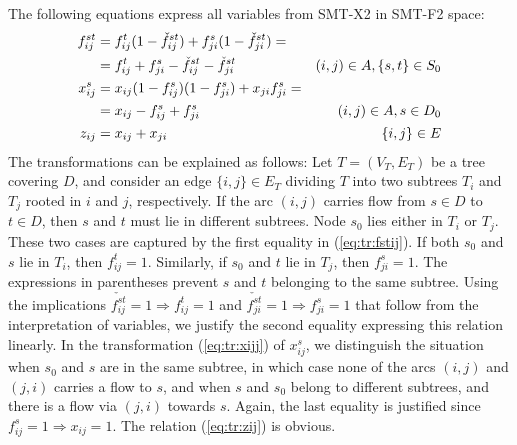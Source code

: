 The following equations express all variables from SMT-X2 in SMT-F2 space:
\begin{subequations}
\begin{align}
\notag\label{eq:tr:fstij}f^{st}_{ij}&=f^t_{ij}(1-\check{f}^{st}_{ij})+f^{s}_{ji}(1-\check{f}^{st}_{ji})= \\
&=  f^t_{ij}+f^s_{ji} - \check{f}^{st}_{ij} - \check{f}^{st}_{ji}& (i,j)\in A, \{s,t\}\in S_0\\
\notag\label{eq:tr:xijj}x^s_{ij}&=x_{ij}(1-f^{s}_{ij})(1-f^{s}_{ji})+x_{ji}f^{s}_{ji}=
\\&= x_{ij}-f^s_{ij} + f^{s}_{ji} & (i,j)\in A, s\in D_0\\
\label{eq:tr:zij}z_{ij}&=x_{ij}+x_{ji}& \{i,j\}\in E
\end{align}
\end{subequations}
The transformations can be explained as follows:
Let $T=(V_T,E_T)$ be a tree covering $D$, and consider an edge $\{i,j\}\in E_T$ dividing $T$ into two subtrees $T_i$ and $T_j$ rooted in $i$ and $j$, respectively.  If the arc $(i,j)$ carries flow from $s\in D$ to $t\in D$, then $s$ and $t$ must lie in different subtrees. Node $s_0$ lies either in $T_i$ or $T_j$.
These two cases are captured by the first equality in (\ref{eq:tr:fstij}). If both $s_0$ and $s$ lie in $T_i$, then $f_{ij}^t=1$. Similarly, if $s_0$ and $t$ lie in $T_j$, then $f_{ji}^s=1$. The expressions in parentheses prevent $s$ and $t$ belonging to the same subtree. Using the implications $\check{f^{st}_{ij}}=1\Rightarrow f_{ij}^t=1$ and $\check{f^{st}_{ji}}=1\Rightarrow f_{ji}^s=1$ that follow from the interpretation of variables, we justify the second equality expressing this relation linearly.
In the transformation (\ref{eq:tr:xijj}) of $x_{ij}^s$, we distinguish the situation when $s_0$ and $s$ are in the same subtree, in which case none of the arcs $(i,j)$ and $(j,i)$ carries a flow to $s$, and when $s$ and $s_0$ belong to different subtrees, and there is a flow via $(j,i)$ towards $s$. Again, the last equality is justified since $f_{ij}^s=1\Rightarrow x_{ij}=1$. The relation (\ref{eq:tr:zij}) is obvious.

